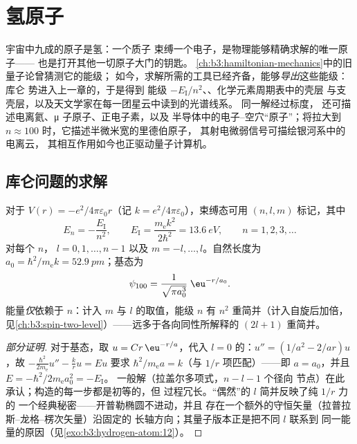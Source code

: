 \chapter{氢原子}\label{ch:b3:hydrogen-atom}

宇宙中九成的原子是氢：一个质子
束缚一个电子，是物理能够精确求解的唯一原子——
也是打开其他一切原子大门的钥匙。
\cref{ch:b3:hamiltonian-mechanics}中的旧量子论曾猜测它的能级；
如今，求解所需的工具已经齐备，能够\emph{导出}这些能级：库仑
势进入上一章的，于是得到
能级 $-E_{\text{I}}/n^2$、、化学元素周期表中的壳层
与支壳层，以及天文学家在每一团星云中读到的光谱线系。
同一解经过标度，
还可描述电离氦、μ 子原子、正电子素，以及
半导体中的电子–空穴“原子”；将拉大到 $n
\approx 100$ 时，它描述半微米宽的里德伯原子，
其射电微弱信号可描绘银河系中的电离云，
其相互作用如今也正驱动量子计算机。

\section{库仑问题的求解}

\begin{theorem}[氢原子的能级]\label{thm:b3:hydrogen-atom:levels}
对于 $V(r) = -e^2/4\pi\varepsilon_0 r$（记 $k = e^2/4\pi
\varepsilon_0$），束缚态可用 $(n, l, m)$ 标记，其中
\[
E_n = -\frac{E_{\text{I}}}{n^2} , \qquad
E_{\text{I}} = \frac{m_{\text{e}}k^2}{2\hbar^2} = \qty{13.6}{eV} ,
\qquad n = 1, 2, 3, \dots
\]
对每个 $n$， $l = 0, 1, \dots, n-1$ 以及
$m = -l, \dots, l$。自然长度为 $a_0 =
\hbar^2/m_{\text{e}}k = \qty{52.9}{pm}$；基态为
\[
\psi_{100} = \frac{1}{\sqrt{\pi a_0^3}}\;\eu^{-r/a_0} .
\]
能量\emph{仅}依赖于 $n$：计入 $m$ 与
$l$ 的取值，能级 $n$ 有 $n^2$ 重简并（计入自旋后加倍，
见\cref{ch:b3:spin-two-level}）——远多于各向同性所解释的
$(2l+1)$ 重简并。
\end{theorem}

\begin{proof}[部分证明]
对于基态，取 $u = Cr\,\eu^{-r/a}$，代入
$l = 0$ 的：$u'' = (1/a^2 - 2/ar)u$，故
$-\tfrac{\hbar^2}{2m_{\text{e}}}u'' - \tfrac kr u = Eu$ 要求
$\hbar^2/m_{\text{e}}a = k$（与 $1/r$ 项匹配）——即
$a = a_0$，并且 $E = -\hbar^2/2m_{\text{e}}a_0^2 = -E_{\text{I}}$。
一般解（拉盖尔多项式，$n - l - 1$ 个径向
节点）在此承认；构造的每一步都是初等的，但
过程冗长。“偶然”的 $l$ 简并反映了纯 $1/r$ 力的
一个经典秘密——开普勒椭圆不进动，并且
存在一个额外的守恒矢量（拉普拉斯–龙格–楞次矢量）沿固定的
长轴方向；其量子版本正是把不同 $l$ 联系到
同一能量的原因（见\cref{exo:b3:hydrogen-atom:12}）。
\end{proof}

